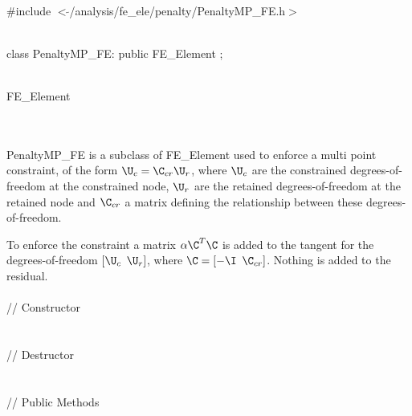 
   \\
\#include $<\tilde{ }$/analysis/fe\_ele/penalty/PenaltyMP\_FE.h$>$  


  \\
class PenaltyMP\_FE: public FE\_Element ;  


  \\
FE\_Element 

\indent{} \\ 

  \\
\indent PenaltyMP\_FE is a subclass of FE\_Element used to enforce a
multi point constraint, of the form $\U_c = \C_{cr} \U_r$, where $\U_c$ are
the constrained degrees-of-freedom at the constrained node, $\U_r$ are
the retained degrees-of-freedom at the retained node and $\C_{cr}$ a
matrix defining the relationship between these degrees-of-freedom. 

To enforce the constraint a matrix $\alpha \C^T \C$ is added to the
tangent for the degrees-of-freedom $[\U_c$ $\U_r]$, where $\C = [-\I$ 
$\C_{cr}]$. Nothing is added to the residual. \\  

  \\
\indent\indent // Constructor  \\
\indent{} \\ \\
\indent\indent // Destructor  \\
\indent{}  \\ \\
\indent\indent // Public Methods \\
\indent{} \\ 
\indent{} \\  
\indent{} \\ 
\indent{}\\

